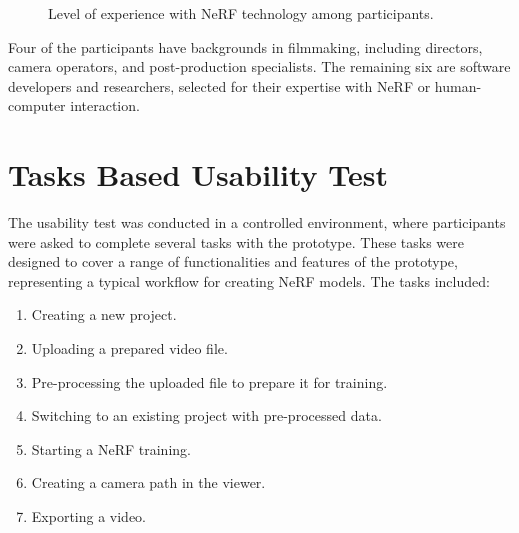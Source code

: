\begin{figure}[htb]
  \centering
  \caption{Level of experience with NeRF technology among participants.}
  \label{fig:study:experience}  
\end{figure}

Four of the participants have backgrounds in filmmaking, including directors, camera operators, and post-production specialists.
The remaining six are software developers and researchers, selected for their expertise with NeRF or human-computer interaction.

\section{Tasks Based Usability Test}
\label{sec:study:tasks}

The usability test was conducted in a controlled environment, where participants were asked to complete several tasks with the prototype.
These tasks were designed to cover a range of functionalities and features of the prototype, representing a typical workflow for creating NeRF models.
The tasks included:

\begin{enumerate}
  \item Creating a new project.
  \item Uploading a prepared video file.
  \item Pre-processing the uploaded file to prepare it for training.
  \item Switching to an existing project with pre-processed data.
  \item Starting a NeRF training.
  \item Creating a camera path in the viewer.
  \item Exporting a video.
\end{enumerate}

